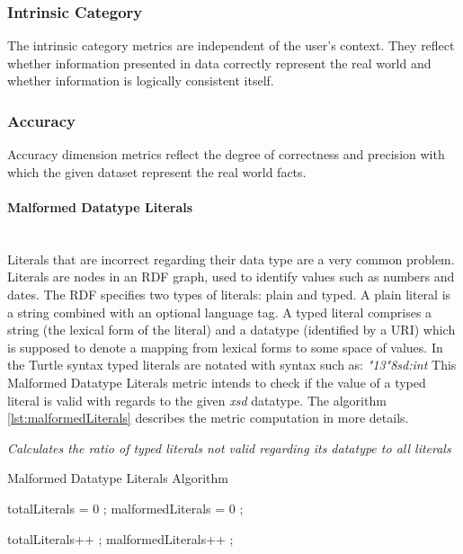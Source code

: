 
\subsubsection{Intrinsic Category}
\label{sec:Intrinsic}

The intrinsic category metrics are independent of the user's context.
They reflect whether information presented in data correctly represent the real world and whether information is logically consistent itself.

\subsubsection{Accuracy} %

Accuracy dimension metrics reflect the degree of correctness and precision with which the given dataset represent the real world facts.


\paragraph{Malformed Datatype Literals} ~\\ %
\label{par:malformed}
Literals that are incorrect regarding their data type are a very common problem.
Literals are nodes in an RDF graph, used to identify values such as numbers and dates.
The RDF specifies two types of literals: plain and typed.
A plain literal is a string combined with an optional language tag.
A typed literal comprises a string (the lexical form of the literal) and a datatype (identified by a URI) which is supposed to denote a mapping from lexical forms to some space of values.
In the Turtle syntax typed literals are notated with syntax such as: \textit{"13"^^xsd:int}
This Malformed Datatype Literals metric intends to check if the value of a typed literal is valid with regards to the given \textit{xsd} datatype.
The algorithm \ref{lst:malformedLiterals} describes the metric computation in more details.

\begin{mdframed}[style=metricdefinition]
\emph{Calculates the ratio of typed literals  not valid regarding its datatype to all literals}
\end{mdframed}

\begin{algorithm}
\caption{Malformed Datatype Literals Algorithm}\label{lst:malformedLiterals}
\begin{algorithmic}[1]
\State totalLiterals = 0 ;
\State malformedLiterals = 0 ;
\EndProcedure

 totalLiterals++ ;
 malformedLiterals++ ; \EndIf
 \EndIf
{}
\EndProcedure
\end{algorithmic}
\end{algorithm}

